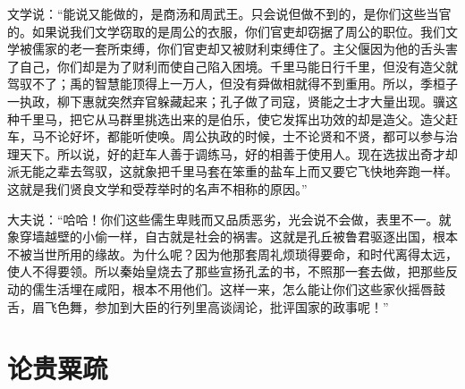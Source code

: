 \documentclass[12pt,UTF-8,openany,a4]{ctexbook}
\begin{document}
\begin{large}
    文学说：“能说又能做的，是商汤和周武王。只会说但做不到的，是你们这些当官的。如果说我们文学窃取的是周公的衣服，你们官吏却窃据了周公的职位。我们文学被儒家的老一套所束缚，你们官吏却又被财利束缚住了。主父偃因为他的舌头害了自己，你们却是为了财利而使自己陷入困境。千里马能日行千里，但没有造父就驾驭不了；禹的智慧能顶得上一万人，但没有舜做相就得不到重用。所以，季桓子一执政，柳下惠就突然弃官躲藏起来；孔子做了司寇，贤能之士才大量出现。骥这种千里马，把它从马群里挑选出来的是伯乐，使它发挥出功效的却是造父。造父赶车，马不论好坏，都能听使唤。周公执政的时候，士不论贤和不贤，都可以参与治理天下。所以说，好的赶车人善于调练马，好的相善于使用人。现在选拔出奇才却派无能之辈去驾驭，这就象把千里马套在笨重的盐车上而又要它飞快地奔跑一样。这就是我们贤良文学和受荐举时的名声不相称的原因。”
    
    大夫说：“哈哈！你们这些儒生卑贱而又品质恶劣，光会说不会做，表里不一。就象穿墙越壁的小偷一样，自古就是社会的祸害。这就是孔丘被鲁君驱逐出国，根本不被当世所用的缘故。为什么呢？因为他那套周礼烦琐得要命，和时代离得太远，使人不得要领。所以秦始皇烧去了那些宣扬孔孟的书，不照那一套去做，把那些反动的儒生活埋在咸阳，根本不用他们。这样一来，怎么能让你们这些家伙摇唇鼓舌，眉飞色舞，参加到大臣的行列里高谈阔论，批评国家的政事呢！”
    
\end{large}



\chapter{论贵粟疏}
\end{document}
